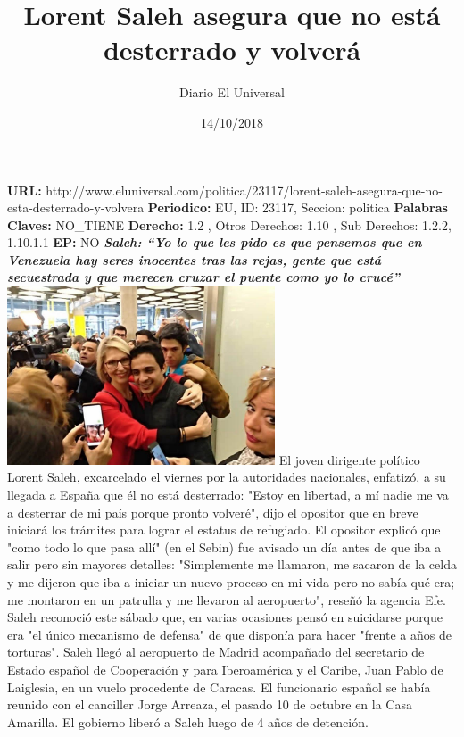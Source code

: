 \documentclass{article}%
\title{\textbf{Lorent Saleh asegura que no está desterrado y volverá}}%
\author{Diario El Universal}%
\date{14/10/2018}%
\begin{document}
%
\normalsize%
\maketitle%
\textbf{URL: }%
http://www.eluniversal.com/politica/23117/lorent{-}saleh{-}asegura{-}que{-}no{-}esta{-}desterrado{-}y{-}volvera\newline%
%
\textbf{Periodico: }%
EU, %
ID: %
23117, %
Seccion: %
politica\newline%
%
\textbf{Palabras Claves: }%
NO\_TIENE\newline%
%
\textbf{Derecho: }%
1.2%
, Otros Derechos: %
1.10%
, Sub Derechos: %
1.2.2, 1.10.1.1%
\newline%
%
\textbf{EP: }%
NO\newline%
\newline%
%
\textbf{\textit{Saleh: “Yo lo que les pido es que pensemos que en Venezuela hay seres inocentes tras las rejas, gente que está secuestrada y que merecen cruzar el puente como yo lo crucé”}}%
\newline%
\newline%
%
\includegraphics[width=300px]{105.jpg}%
\newline%
%
El joven dirigente político Lorent Saleh, excarcelado el viernes por la autoridades nacionales, enfatizó, a su llegada a España que él no está desterrado: "Estoy en libertad, a mí nadie me va a desterrar de mi país porque pronto volveré", dijo el opositor que en breve iniciará los trámites para lograr el estatus de refugiado.%
\newline%
%
El opositor explicó que "como todo lo que pasa allí" (en el Sebin) fue avisado un día antes de que iba a salir pero sin mayores detalles: "Simplemente me llamaron, me sacaron de la celda y me dijeron que iba a iniciar un nuevo proceso en mi vida pero no sabía qué era; me montaron en un patrulla y me llevaron al aeropuerto", reseñó la agencia Efe.%
\newline%
%
Saleh reconoció este sábado  que, en varias ocasiones pensó en suicidarse porque era "el único mecanismo de defensa" de que disponía para hacer "frente a años de torturas".%
\newline%
%
Saleh llegó al aeropuerto de Madrid acompañado del secretario de Estado español de Cooperación y para Iberoamérica y el Caribe, Juan Pablo de Laiglesia, en un vuelo procedente de Caracas.%
\newline%
%
El funcionario español se había reunido con el canciller Jorge Arreaza, el pasado 10 de octubre en la Casa Amarilla.%
\newline%
%
El gobierno liberó a Saleh luego de 4 años de detención.%
\newline%
%
\end{document}
